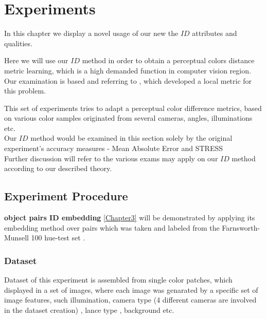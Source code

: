 
\chapter{Experiments} %

\label{Chapter8}

In this chapter we display a novel usage of our new the $ID$ attributes and qualities.

Here we will use our $ID$ method in order to obtain a perceptual colors distance metric learning, which is a high demanded function in computer vision region. Our examination is based and referring to \cite{perp_color}, which developed a local metric for this problem. 

This set of experiments tries to adapt a perceptual color difference metrics, based on various color samples originated from several cameras, angles, illuminations etc.
\\

Our $ID$ method would be examined in this section solely by the original experiment's accuracy measures - Mean Absolute Error \cite{MAE} and STRESS \cite{STRESS}
\\
Further discussion will refer to the various exams may apply on our $ID$ method according to our described theory.

\section{Experiment Procedure}



\textbf{object pairs ID embedding} \ref{Chapter3} will be demonstrated by applying its embedding method over pairs which was taken and labeled from the Farnsworth-Munsell 100 hue-test set \cite{furnsworth}.
\subsection{Dataset}

Dataset of this experiment is assembled from single color patches, which displayed in a set of images, where each image was genarated by a specific set of image features, such illumination, camera type (4 different cameras are involved in the dataset creation) , lance type , background etc.

